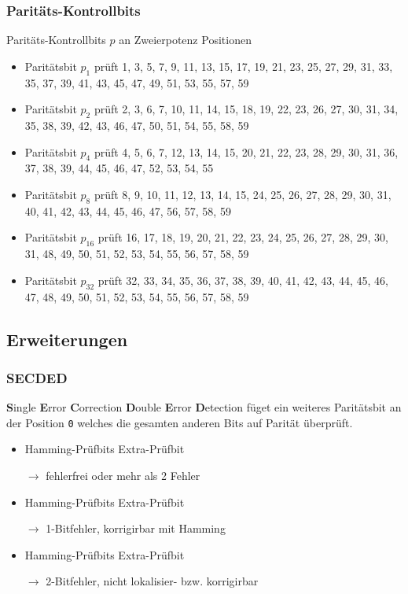 \documentclass
[
	8pt,		%
	ngerman,	%
	a4paper,	%
	landscape,	%
	final		%
]{extarticle}
\newcommand{\cmark}{\textcolor{cmark}{\ding{51}}}
\newcommand{\xmark}{\textcolor{xmark}{\ding{55}}}
\begin{document}
\begin{multicols*}{4}
\subsubsection*{Paritäts-Kontrollbits}
Paritäts-Kontrollbits $p$ an Zweierpotenz Positionen
\begin{itemize}
	\item Paritätsbit $p_{1}$ prüft 1, 3, 5, 7, 9, 11, 13, 15, 17, 19, 21, 23, 25, 27, 29, 31, 33, 35, 37, 39, 41, 43, 45, 47, 49, 51, 53, 55, 57, 59
	\item Paritätsbit $p_{2}$ prüft 2, 3, 6, 7, 10, 11, 14, 15, 18, 19, 22, 23, 26, 27, 30, 31, 34, 35, 38, 39, 42, 43, 46, 47, 50, 51, 54, 55, 58, 59
	\item Paritätsbit $p_{4}$ prüft 4, 5, 6, 7, 12, 13, 14, 15, 20, 21, 22, 23, 28, 29, 30, 31, 36, 37, 38, 39, 44, 45, 46, 47, 52, 53, 54, 55
	\item Paritätsbit $p_{8}$ prüft 8, 9, 10, 11, 12, 13, 14, 15, 24, 25, 26, 27, 28, 29, 30, 31, 40, 41, 42, 43, 44, 45, 46, 47, 56, 57, 58, 59
	\item Paritätsbit $p_{16}$ prüft 16, 17, 18, 19, 20, 21, 22, 23, 24, 25, 26, 27, 28, 29, 30, 31, 48, 49, 50, 51, 52, 53, 54, 55, 56, 57, 58, 59
	\item Paritätsbit $p_{32}$ prüft 32, 33, 34, 35, 36, 37, 38, 39, 40, 41, 42, 43, 44, 45, 46, 47, 48, 49, 50, 51, 52, 53, 54, 55, 56, 57, 58, 59
\end{itemize}
\subsection{Erweiterungen}
\subsubsection*{SECDED}
\textbf{S}ingle \textbf{E}rror \textbf{C}orrection \textbf{D}ouble \textbf{E}rror
\textbf{D}etection füget ein weiteres Paritätsbit an der Position \texttt{0} welches
die gesamten anderen Bits auf Parität überprüft. \par
\begin{itemize}
	\item Hamming-Prüfbits \cmark \quad Extra-Prüfbit \cmark\par
	      $\longrightarrow$ fehlerfrei oder mehr als 2 Fehler
	\item Hamming-Prüfbits \xmark \quad Extra-Prüfbit \xmark\par
	      $\longrightarrow$ 1-Bitfehler, korrigirbar mit Hamming
	\item Hamming-Prüfbits \xmark \quad Extra-Prüfbit \cmark\par
	      $\longrightarrow$ 2-Bitfehler, nicht lokalisier- bzw. korrigirbar
\end{itemize}



\end{multicols*}
\end{document}
